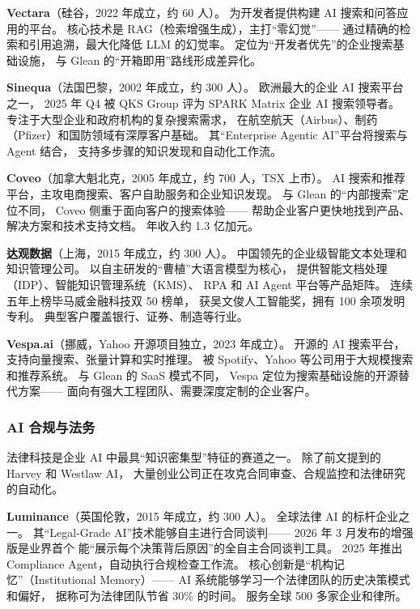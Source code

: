 \textbf{Vectara}（硅谷，2022 年成立，约 60 人）。
为开发者提供构建 AI 搜索和问答应用的平台。
核心技术是 RAG（检索增强生成），主打``零幻觉''——
通过精确的检索和引用追溯，最大化降低 LLM 的幻觉率。
定位为``开发者优先''的企业搜索基础设施，
与 Glean 的``开箱即用''路线形成差异化。

\textbf{Sinequa}（法国巴黎，2002 年成立，约 300 人）。
欧洲最大的企业 AI 搜索平台之一，
2025 年 Q4 被 QKS Group 评为 SPARK Matrix 企业 AI 搜索领导者。
专注于大型企业和政府机构的复杂搜索需求，
在航空航天（Airbus）、制药（Pfizer）和国防领域有深厚客户基础。
其``Enterprise Agentic AI''平台将搜索与 Agent 结合，
支持多步骤的知识发现和自动化工作流。

\textbf{Coveo}（加拿大魁北克，2005 年成立，约 700 人，TSX 上市）。
AI 搜索和推荐平台，主攻电商搜索、客户自助服务和企业知识发现。
与 Glean 的``内部搜索''定位不同，
Coveo 侧重于面向客户的搜索体验——
帮助企业客户更快地找到产品、解决方案和技术支持文档。
年收入约 1.3 亿加元。

\textbf{达观数据}（上海，2015 年成立，约 300 人）。
中国领先的企业级智能文本处理和知识管理公司。
以自主研发的``曹植''大语言模型为核心，
提供智能文档处理（IDP）、智能知识管理系统（KMS）、
RPA 和 AI Agent 平台等产品矩阵。
连续五年上榜毕马威金融科技双 50 榜单，
获吴文俊人工智能奖，拥有 100 余项发明专利。
典型客户覆盖银行、证券、制造等行业。

\textbf{Vespa.ai}（挪威，Yahoo 开源项目独立，2023 年成立）。
开源的 AI 搜索平台，支持向量搜索、张量计算和实时推理。
被 Spotify、Yahoo 等公司用于大规模搜索和推荐系统。
与 Glean 的 SaaS 模式不同，
Vespa 定位为搜索基础设施的开源替代方案——
面向有强大工程团队、需要深度定制的企业客户。

\subsubsection{AI 合规与法务}

法律科技是企业 AI 中最具``知识密集型''特征的赛道之一。
除了前文提到的 Harvey 和 Westlaw AI，
大量创业公司正在攻克合同审查、合规监控和法律研究的自动化。

\textbf{Luminance}（英国伦敦，2015 年成立，约 300 人）。
全球法律 AI 的标杆企业之一。
其``Legal-Grade AI''技术能够自主进行合同谈判——
2026 年 3 月发布的增强版是业界首个
能``展示每个决策背后原因''的全自主合同谈判工具。
2025 年推出 Compliance Agent，自动执行合规检查工作流。
核心创新是``机构记忆''（Institutional Memory）——
AI 系统能够学习一个法律团队的历史决策模式和偏好，
据称可为法律团队节省 30\% 的时间。
服务全球 500 多家企业和律所。

